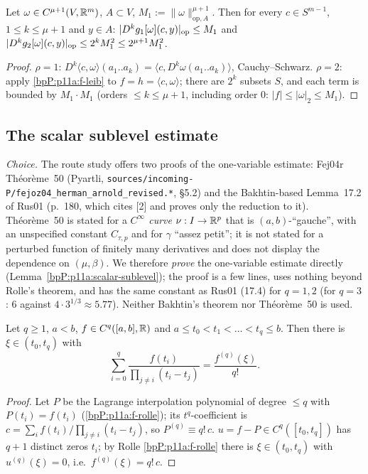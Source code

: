 \begin{lemma}\label{bpP:p11a:M-bound}
Let $\omega\in C^{\mu+1}(V,\mathbb{R}^m)$, $A\subset V$, $M_1:=\lVert\omega\rVert^{\mu+1}_{\mathrm{op},A}$. Then for every $c\in S^{m-1}$, $1\le k\le\mu+1$ and $y\in A$: $\lvert D^kg_1[\omega](c,y)\rvert_{\mathrm{op}}\le M_1$ and $\lvert D^kg_2[\omega](c,y)\rvert_{\mathrm{op}}\le2^kM_1^2\le2^{\mu+1}M_1^2$.
\end{lemma}
\begin{proof}
$\rho=1$: $D^k\langle c,\omega\rangle(a_1..a_k)=\langle c,D^k\omega(a_1..a_k)\rangle$, Cauchy--Schwarz. $\rho=2$: apply \ref{bpP:p11a:f-leib} to $f=h=\langle c,\omega\rangle$; there are $2^k$ subsets $S$, and each term is bounded by $M_1\cdot M_1$ (orders $\le k\le\mu+1$, including order $0$: $\lvert f\rvert\le\lvert\omega\rvert_2\le M_1$).
\end{proof}

\subsection{The scalar sublevel estimate}\label{bpP:p11a:sec-sublevel}

\emph{Choice.} The route study offers two proofs of the one-variable estimate: Fej04r Th\'eor\`eme~50 (Pyartli, \texttt{sources/incoming-P/fejoz04\_herman\_arnold\_revised.*}, \S5.2) and the Bakhtin-based Lemma~17.2 of Rus01 (p.~180, which cites [2] and proves only the reduction to it). Th\'eor\`eme~50 is stated for a \emph{$C^\infty$ curve} $\nu:I\to\mathbb{R}^p$ that is $(a,b)$-``gauche'', with an unspecified constant $C_{\tau,p}$ and for $\gamma$ ``assez petit''; it is not stated for a perturbed function of finitely many derivatives and does not display the dependence on $(\mu,\beta)$. We therefore \emph{prove} the one-variable estimate directly (Lemma~\ref{bpP:p11a:scalar-sublevel}); the proof is a few lines, uses nothing beyond Rolle's theorem, and has the same constant as Rus01 (17.4) for $q=1,2$ (for $q=3$: $6$ against $4\cdot3^{1/3}\approx5.77$). Neither Bakhtin's theorem nor Th\'eor\`eme~50 is used.

\begin{lemma}\label{bpP:p11a:divided-difference}
Let $q\ge1$, $a<b$, $f\in C^q([a,b],\mathbb{R})$ and $a\le t_0<t_1<\dots<t_q\le b$. Then there is $\xi\in(t_0,t_q)$ with
\[\sum_{i=0}^q\frac{f(t_i)}{\prod_{j\ne i}(t_i-t_j)}=\frac{f^{(q)}(\xi)}{q!}.\]
\end{lemma}
\begin{proof}
\label{stepP:p11a:dd-interp} Let $P$ be the Lagrange interpolation polynomial of degree $\le q$ with $P(t_i)=f(t_i)$ (\ref{bpP:p11a:f-rolle}); its $t^q$-coefficient is $c=\sum_if(t_i)/\prod_{j\ne i}(t_i-t_j)$, so $P^{(q)}\equiv q!\,c$.
\label{stepP:p11a:dd-rolle} $u=f-P\in C^q([t_0,t_q])$ has $q+1$ distinct zeros $t_i$; by Rolle \ref{bpP:p11a:f-rolle} there is $\xi\in(t_0,t_q)$ with $u^{(q)}(\xi)=0$, i.e.\ $f^{(q)}(\xi)=q!\,c$.
\end{proof}

